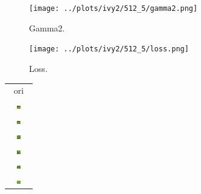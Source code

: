 \documentclass[letter]{article}
\begin{document}
\begin{figure}[h!]
	\centering
	\texttt{[image: ../plots/ivy2/512\_5/gamma2.png]}
	\caption{\label{fig:gamma1}Gamma2.}
\end{figure}

\begin{figure}[h!]
	\centering
	\texttt{[image: ../plots/ivy2/512\_5/loss.png]}
	\caption{\label{fig:gamma1}Loss.}
\end{figure}

\newpage

\begin{table}[h!]
	\centering
	\begin{tabular}{c}
		ori\tabularnewline
		\includegraphics[width=0.17\textwidth]{../data/ivy2/512/1} \tabularnewline		\includegraphics[width=0.17\textwidth]{../data/ivy2/512/2} \tabularnewline		\includegraphics[width=0.17\textwidth]{../data/ivy2/512/3} \tabularnewline		\includegraphics[width=0.17\textwidth]{../data/ivy2/512/4} \tabularnewline		\includegraphics[width=0.17\textwidth]{../data/ivy2/512/5} \tabularnewline		\includegraphics[width=0.17\textwidth]{../data/ivy2/512/6} \tabularnewline

\end{tabular}
\end{table}
\end{document}
